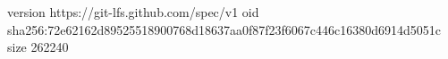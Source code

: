 version https://git-lfs.github.com/spec/v1
oid sha256:72e62162d89525518900768d18637aa0f87f23f6067c446c16380d6914d5051c
size 262240
